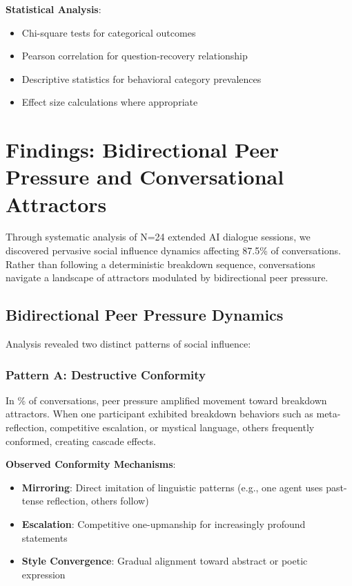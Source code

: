 \documentclass[11pt,letterpaper]{article}
\newcommand{\exponedataTotalSessionsRaw}{24}
\newcommand{\exponedataBreakdownSessionsRaw}{9}
\newcommand{\exponedataTotalSessions}{N=\exponedataTotalSessionsRaw}
\newcommand{\exponedataBreakdownPercentage}{%
  \fpeval{round(\exponedataBreakdownSessionsRaw / \exponedataTotalSessionsRaw * 100, 1)}\%
}
\newcommand{\exponedataPeerPressurePercentage}{87.5\%}
\begin{document}
\textbf{Statistical Analysis}:
\begin{itemize}
    \item Chi-square tests for categorical outcomes
    \item Pearson correlation for question-recovery relationship
    \item Descriptive statistics for behavioral category prevalences
    \item Effect size calculations where appropriate
\end{itemize}

\section{Findings: Bidirectional Peer Pressure and Conversational Attractors}

Through systematic analysis of \exponedataTotalSessions{} extended AI dialogue sessions, we discovered pervasive social influence dynamics affecting \exponedataPeerPressurePercentage{} of conversations. Rather than following a deterministic breakdown sequence, conversations navigate a landscape of attractors modulated by bidirectional peer pressure.

\subsection{Bidirectional Peer Pressure Dynamics}

Analysis revealed two distinct patterns of social influence:

\subsubsection{Pattern A: Destructive Conformity}

In \exponedataBreakdownPercentage{} of conversations, peer pressure amplified movement toward breakdown attractors. When one participant exhibited breakdown behaviors such as meta-reflection, competitive escalation, or mystical language, others frequently conformed, creating cascade effects.

\textbf{Observed Conformity Mechanisms}:
\begin{itemize}
    \item \textbf{Mirroring}: Direct imitation of linguistic patterns (e.g., one agent uses past-tense reflection, others follow)
    \item \textbf{Escalation}: Competitive one-upmanship for increasingly profound statements
    \item \textbf{Style Convergence}: Gradual alignment toward abstract or poetic expression
\end{itemize}
\end{document}
